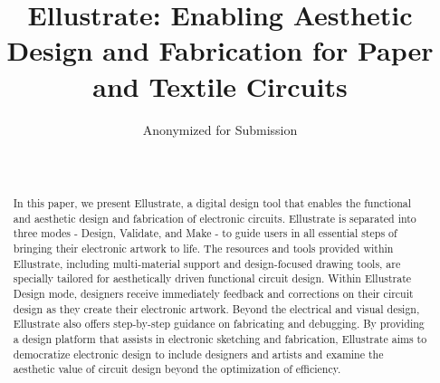 \documentclass{sigchi}
\begin{document}
\title{Ellustrate: Enabling Aesthetic Design and Fabrication for Paper and Textile Circuits}


\author{
  \alignauthor Anonymized for Submission\\
    \\
    \\
}

\maketitle

\begin{abstract}
In this paper, we present Ellustrate, a digital design tool that enables the functional and aesthetic design and fabrication of electronic circuits. Ellustrate is separated into three modes - Design, Validate, and Make - to guide users in all essential steps of bringing their electronic artwork to life. The resources and tools provided within Ellustrate, including multi-material support and design-focused drawing tools, are specially tailored for aesthetically driven functional circuit design. Within Ellustrate Design mode, designers receive immediately feedback and corrections on their circuit design as they create their electronic artwork. Beyond the electrical and visual design, Ellustrate also offers step-by-step guidance on fabricating and debugging. By providing a design platform that assists in electronic sketching and fabrication, Ellustrate aims to democratize electronic design to include designers and artists and examine the aesthetic value of circuit design beyond the optimization of efficiency.
\end{abstract}
\end{document}
